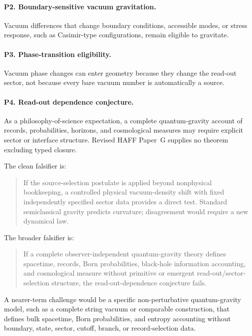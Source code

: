 \documentclass[12pt,a4paper]{article}
\theoremstyle{definition}
\theoremstyle{remark}
\begin{document}
\paragraph{P2. Boundary-sensitive vacuum gravitation.}
Vacuum differences that change boundary conditions, accessible modes, or stress response, such as Casimir-type configurations, remain eligible to gravitate.

\paragraph{P3. Phase-transition eligibility.}
Vacuum phase changes can enter geometry because they change the read-out sector, not because every bare vacuum number is automatically a source.

\paragraph{P4. Read-out dependence conjecture.}
As a philosophy-of-science expectation, a complete quantum-gravity account of records, probabilities, horizons, and cosmological measures may require explicit sector or interface structure.  Revised HAFF Paper~G supplies no theorem excluding typed closure.

The clean falsifier is:

\begin{quote}
If the source-selection postulate is applied beyond nonphysical bookkeeping, a controlled physical vacuum-density shift with fixed independently specified sector data provides a direct test.  Standard semiclassical gravity predicts curvature; disagreement would require a new dynamical law.
\end{quote}

The broader falsifier is:

\begin{quote}
If a complete observer-independent quantum-gravity theory defines spacetime, records, Born probabilities, black-hole information accounting, and cosmological measure without primitive or emergent read-out/sector-selection structure, the read-out-dependence conjecture fails.
\end{quote}

A nearer-term challenge would be a specific non-perturbative quantum-gravity model, such as a complete string vacuum or comparable construction, that defines bulk spacetime, Born probabilities, and entropy accounting without boundary, state, sector, cutoff, branch, or record-selection data.
\end{document}
